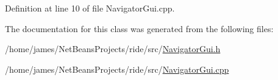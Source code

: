 Definition at line 10 of file Navigator\-Gui.\-cpp.



The documentation for this class was generated from the following files\-:\begin{DoxyCompactItemize}
\item 
/home/james/\-Net\-Beans\-Projects/ride/src/\hyperlink{_navigator_gui_8h}{Navigator\-Gui.\-h}\item 
/home/james/\-Net\-Beans\-Projects/ride/src/\hyperlink{_navigator_gui_8cpp}{Navigator\-Gui.\-cpp}\end{DoxyCompactItemize}
